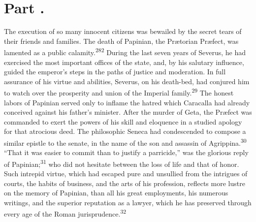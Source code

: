 



\section{Part \thesection.}

The execution of so many innocent citizens was bewailed by the
secret tears of their friends and families. The death of
Papinian, the Prætorian Præfect, was lamented as a public
calamity.\textsuperscript{282} During the last seven years of Severus, he had
exercised the most important offices of the state, and, by his
salutary influence, guided the emperor’s steps in the paths of
justice and moderation. In full assurance of his virtue and
abilities, Severus, on his death-bed, had conjured him to watch
over the prosperity and union of the Imperial family.\textsuperscript{29} The
honest labors of Papinian served only to inflame the hatred which
Caracalla had already conceived against his father’s minister.
After the murder of Geta, the Præfect was commanded to exert the
powers of his skill and eloquence in a studied apology for that
atrocious deed. The philosophic Seneca had condescended to
compose a similar epistle to the senate, in the name of the son
and assassin of Agrippina.\textsuperscript{30} “That it was easier to commit than
to justify a parricide,” was the glorious reply of Papinian;\textsuperscript{31}
who did not hesitate between the loss of life and that of honor.
Such intrepid virtue, which had escaped pure and unsullied from
the intrigues of courts, the habits of business, and the arts of
his profession, reflects more lustre on the memory of Papinian,
than all his great employments, his numerous writings, and the
superior reputation as a lawyer, which he has preserved through
every age of the Roman jurisprudence.\textsuperscript{32}

